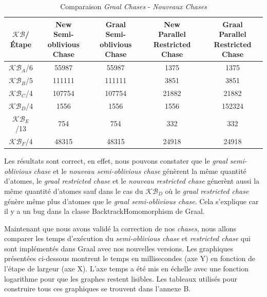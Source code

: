 \begin{table}[H]
\begin{center}
\begin{tabular}{|c|c|c|c|c|} 
    \hline
    $\mathcal{KB}$/Étape & \shortstack{New \\ Semi-oblivious Chase}  & \shortstack{Graal \\ Semi-oblivious Chase} & \shortstack{New \\ Parallel Restricted Chase} & \shortstack{Graal \\ Parallel Restricted Chase} \\
    \hline
     \hline
    $\mathcal{KB}_A$/6 & 55987 & 55987 & 1375 & 1375 \\ 
     \hline
    $\mathcal{KB}_B$/5 & 111111 & 111111 & 3851 & 3851 \\ 
    \hline
    $\mathcal{KB}_C$/4 & 107754 & 107754 & 21882 & 21882 \\ 
    \hline
    $\mathcal{KB}_D$/4 & 1556 & 1556 & 1556 & 152324 \\ 
    \hline
    $\mathcal{KB}_E$/13 & 754 & 754 & 332 & 332 \\ 
     \hline
    $\mathcal{KB}_F$/4 & 48315 & 48315 & 24918 & 24918 \\ 
     \hline 
\end{tabular}    
\caption {Comparaison \textit{Graal Chases} - \textit{Nouveaux Chases}} \label{tab:faitsoldnew}
\end{center}
\end{table}

Les résultats sont correct, en effet, nous pouvons constater que le \textit{graal semi-oblivious chase} et le \textit{nouveau semi-oblivious chase} génèrent la même quantité d'atomes, le \textit{graal restricted chase} et le \textit{nouveau restricted chase} génerènt aussi la même quantité d'atomes sauf dans le cas du $\mathcal{KB}_D$ où le \textit{graal restricted chase} génère même plus d'atomes que le \textit{graal semi-oblivious chase}. Cela s'explique car il y a un bug dans la classe BacktrackHomomorphism de Graal.

Maintenant que nous avons validé la correction de nos \textit{chases}, nous allons comparer les temps d'exécution du \textit{semi-oblivious chase} et \textit{restricted chase} qui sont implémentés dans Graal avec nos nouvelles versions. Les graphiques présentées ci-dessous montrent le temps en millisecondes (axe Y) en fonction de l'étape de largeur (axe X). L'axe temps a été mis en échelle avec une fonction logarithme pour que les graphes restent lisibles. Les tableaux utilisés pour construire tous ces graphiques se trouvent dans l'annexe B.

